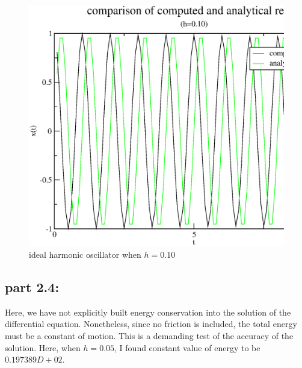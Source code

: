 \documentclass[11pt,a4paper,english]{article}
\begin{document}
	\begin{figure}[h!]
	\centering
	\includegraphics [scale=0.6]{figures/compare10.eps}
	\caption{ideal harmonic oscillator when $ h=0.10$ }
	\end{figure}
	\clearpage
	
	\subsection{part 2.4: }
	Here, we have not explicitly built energy conservation into the solution 
	of the differential equation. Nonetheless, since no friction is included, the 
	total energy must be a constant of motion. This is a demanding test of the 
	accuracy of the solution. Here, when $h=0.05$, I found constant value of
	energy to be $ 0.197389D+02 $.
    
\end{document}

